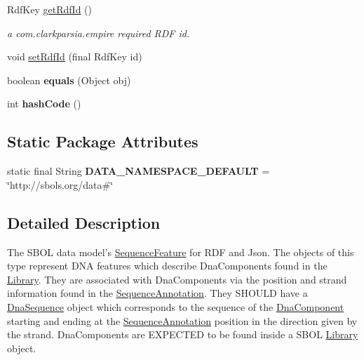 \begin{DoxyCompactItemize}
RdfKey \hyperlink{classorg_1_1sbolstandard_1_1lib_s_b_o_lj_1_1_sequence_feature_a98d34c30847c78a8922be878a2fa4d49}{getRdfId} ()
\begin{DoxyCompactList}\small\item\em a com.clarkparsia.empire required RDF id. \item\end{DoxyCompactList}\item 
void \hyperlink{classorg_1_1sbolstandard_1_1lib_s_b_o_lj_1_1_sequence_feature_afe8d2a1ced8871ba217ddf364366da99}{setRdfId} (final RdfKey id)
\item 
\hypertarget{classorg_1_1sbolstandard_1_1lib_s_b_o_lj_1_1_sequence_feature_ae3ce8ca5a04e8966a9d2158aeeecfc16}{
boolean {\bfseries equals} (Object obj)}
\label{classorg_1_1sbolstandard_1_1lib_s_b_o_lj_1_1_sequence_feature_ae3ce8ca5a04e8966a9d2158aeeecfc16}

\item 
\hypertarget{classorg_1_1sbolstandard_1_1lib_s_b_o_lj_1_1_sequence_feature_a077e18fe97323c7194e2665ffc766399}{
int {\bfseries hashCode} ()}
\label{classorg_1_1sbolstandard_1_1lib_s_b_o_lj_1_1_sequence_feature_a077e18fe97323c7194e2665ffc766399}

\end{DoxyCompactItemize}
\subsection*{Static Package Attributes}
\begin{DoxyCompactItemize}
\item 
\hypertarget{classorg_1_1sbolstandard_1_1lib_s_b_o_lj_1_1_sequence_feature_a20b86331ad9418b0c6b737a193b5b051}{
static final String {\bfseries DATA\_\-NAMESPACE\_\-DEFAULT} = \char`\"{}http://sbols.org/data\#\char`\"{}}
\label{classorg_1_1sbolstandard_1_1lib_s_b_o_lj_1_1_sequence_feature_a20b86331ad9418b0c6b737a193b5b051}

\end{DoxyCompactItemize}


\subsection{Detailed Description}
The SBOL data model's \hyperlink{classorg_1_1sbolstandard_1_1lib_s_b_o_lj_1_1_sequence_feature}{SequenceFeature} for RDF and Json. The objects of this type represent DNA features which describe DnaComponents found in the \hyperlink{classorg_1_1sbolstandard_1_1lib_s_b_o_lj_1_1_library}{Library}. They are associated with DnaComponents via the position and strand information found in the \hyperlink{classorg_1_1sbolstandard_1_1lib_s_b_o_lj_1_1_sequence_annotation}{SequenceAnnotation}. They SHOULD have a \hyperlink{classorg_1_1sbolstandard_1_1lib_s_b_o_lj_1_1_dna_sequence}{DnaSequence} object which corresponds to the sequence of the \hyperlink{classorg_1_1sbolstandard_1_1lib_s_b_o_lj_1_1_dna_component}{DnaComponent} starting and ending at the \hyperlink{classorg_1_1sbolstandard_1_1lib_s_b_o_lj_1_1_sequence_annotation}{SequenceAnnotation} position in the direction given by the strand. DnaComponents are EXPECTED to be found inside a SBOL \hyperlink{classorg_1_1sbolstandard_1_1lib_s_b_o_lj_1_1_library}{Library} object.

